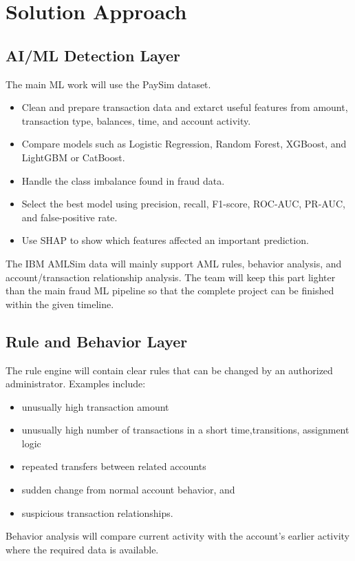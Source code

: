 \documentclass[11pt,a4paper]{article}
\begin{document}
\section{Solution Approach}

\subsection{AI/ML Detection Layer}
The main ML work will use the PaySim dataset.
\begin{itemize}[leftmargin=0.7cm]
    \item Clean and prepare transaction data and extarct useful features from amount, transaction type, balances, time, and account
activity.
    \item Compare models such as Logistic Regression, Random Forest, XGBoost, and LightGBM or CatBoost.
    \item Handle the class imbalance found in fraud data.
    \item Select the best model using precision, recall, F1-score, ROC-AUC, PR-AUC, and
false-positive rate.
    \item Use SHAP to show which features affected an important prediction.
\end{itemize}
The IBM AMLSim data will mainly support AML rules, behavior analysis, and account/transaction relationship analysis. The team will keep this part lighter than the
main fraud ML pipeline so that the complete project can be finished within the given timeline.

\subsection{Rule and Behavior Layer}
The rule engine will contain clear rules that can be changed by an authorized administrator. Examples include:
\begin{itemize}[leftmargin=0.7cm]
    \item unusually high transaction amount
    \item unusually high number of transactions in a short time,transitions, assignment logic
    \item repeated transfers between related accounts
    \item sudden change from normal account behavior, and
    \item suspicious transaction relationships.
\end{itemize}
Behavior analysis will compare current activity with the account’s earlier activity where the required data is available.
\end{document}

